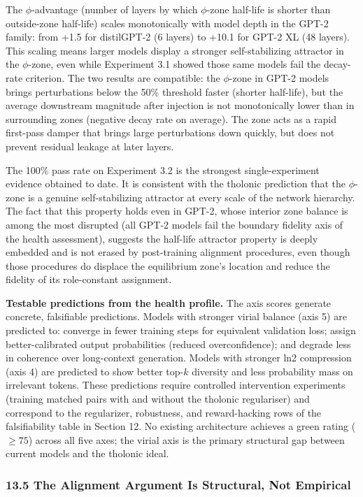 \documentclass[
  11pt,
  letterpaper,
]{article}
\begin{document}
The \(\phi\)-advantage (number of layers by which \(\phi\)-zone
half-life is shorter than outside-zone half-life) scales monotonically
with model depth in the GPT-2 family: from +1.5 for distilGPT-2 (6
layers) to +10.1 for GPT-2 XL (48 layers). This scaling means larger
models display a stronger self-stabilizing attractor in the
\(\phi\)-zone, even while Experiment 3.1 showed those same models fail
the decay-rate criterion. The two results are compatible: the
\(\phi\)-zone in GPT-2 models brings perturbations below the 50\%
threshold faster (shorter half-life), but the average downstream
magnitude after injection is not monotonically lower than in surrounding
zones (negative decay rate on average). The zone acts as a rapid
first-pass damper that brings large perturbations down quickly, but does
not prevent residual leakage at later layers.

The 100\% pass rate on Experiment 3.2 is the strongest single-experiment
evidence obtained to date. It is consistent with the tholonic prediction
that the \(\phi\)-zone is a genuine self-stabilizing attractor at every
scale of the network hierarchy. The fact that this property holds even
in GPT-2, whose interior zone balance is among the most disrupted (all
GPT-2 models fail the boundary fidelity axis of the health assessment),
suggests the half-life attractor property is deeply embedded and is not
erased by post-training alignment procedures, even though those
procedures do displace the equilibrium zone's location and reduce the
fidelity of its role-constant assignment.

\textbf{Testable predictions from the health profile.} The axis scores
generate concrete, falsifiable predictions. Models with stronger virial
balance (axis 5) are predicted to: converge in fewer training steps for
equivalent validation loss; assign better-calibrated output
probabilities (reduced overconfidence); and degrade less in coherence
over long-context generation. Models with stronger ln2 compression (axis
4) are predicted to show better top-\(k\) diversity and less probability
mass on irrelevant tokens. These predictions require controlled
intervention experiments (training matched pairs with and without the
tholonic regulariser) and correspond to the regularizer, robustness, and
reward-hacking rows of the falsifiability table in Section 12. No
existing architecture achieves a green rating (\(\geq 75\)) across all
five axes; the virial axis is the primary structural gap between current
models and the tholonic ideal.

\subsubsection{13.5 The Alignment Argument Is Structural, Not
Empirical}\label{the-alignment-argument-is-structural-not-empirical}
\end{document}
